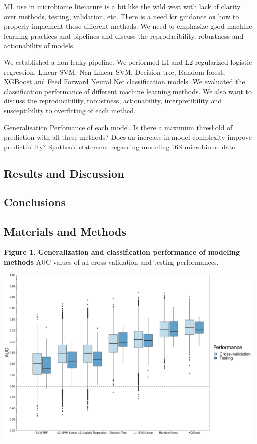 \documentclass[11pt,]{article}
\begin{document}
ML use in microbiome literature is a bit like the wild west with lack of
clarity over methods, testing, validation, etc. There is a need for
guidance on how to properly implement these different methods. We need
to emphasize good machine learning practices and pipelines and discuss
the reproducibility, robustness and actionability of models.

We established a non-leaky pipeline. We performed L1 and L2-regularized
logistic regression, Linear SVM, Non-Linear SVM, Decision tree, Random
forest, XGBoost and Feed Forward Neural Net classification models. We
evaluated the classification performance of different machine learning
methods. We also want to discuss the reproducibility, robustness,
actionability, interpretibility and susceptibility to overfitting of
each method.

Generalisation Perfomance of each model. Is there a maximum threshold of
prediction with all these methods? Does an increase in model complexity
improve predictibility? Synthesis statement regarding modeling 16S
microbiome data

\subsection{Results and Discussion}\label{results-and-discussion}

\subsection{Conclusions}\label{conclusions}

\subsection{Materials and Methods}\label{materials-and-methods}

\newpage

\textbf{Figure 1. Generalization and classification performance of
modeling methods } AUC values of all cross validation and testing
performances.

\begin{center}
\includegraphics[width=7in]{../results/figures/AUC_comparison.pdf}
\end{center}
\end{document}
